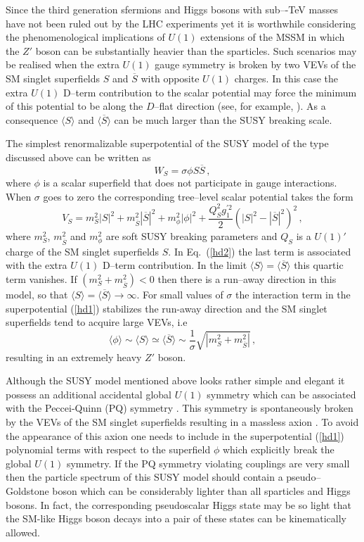 \documentclass[12pt,a4paper]{article}
\newcommand{\be}{\begin{equation}}
\newcommand{\ee}{\end{equation}}
\newcommand{\ds}{\displaystyle}
\begin{document}
 Since the third generation sfermions and Higgs bosons with sub–-TeV
 masses have not been ruled out by the LHC experiments yet it is worthwhile
 considering the phenomenological implications of $U(1)$
 extensions of the MSSM in which the $Z'$ boson can be substantially
 heavier than the sparticles. Such scenarios may be realised when the
 extra $U(1)$ gauge symmetry is broken by two VEVs of the SM singlet
 superfields $S$ and $\overline{S}$ with opposite $U(1)$ charges.  In
 this case the extra $U(1)$ D--term contribution to the scalar
 potential may force the minimum of this potential to be along the
 $D$--flat direction (see, for example, \cite{Kolda:1995iw}).  As a
 consequence $\langle S\rangle$ and $\langle\overline{S}\rangle$ can
 be much larger than the SUSY breaking scale.

The simplest renormalizable superpotential of the SUSY model of the type discussed above
can be written as
\be
W_S=\sigma \phi S \overline{S}\,,
\label{hd1}
\ee
where $\phi$ is a scalar superfield that does not participate in gauge interactions. When
$\sigma$ goes to zero the corresponding tree--level scalar potential takes the form
\begin{equation}
V_S = m^2_S |S|^2 + m^2_{\overline{S}} |\overline{S}|^2 + m^2_{\phi} |\phi|^2
+\ds\frac{Q_S^2 g^{'2}_1}{2}\left(|S|^2-|\overline{S}|^2\right)^2\,,
\label{hd2}
\end{equation}
where $m_S^2$, $m^2_{\overline{S}}$ and $m^2_{\phi}$ are soft SUSY breaking
parameters and $Q_S$ is a $U(1)'$ charge of the SM singlet superfields $S$. In Eq.~(\ref{hd2})
the last term is associated with the extra $U(1)$ D--term contribution. In the limit
$\langle S \rangle = \langle \overline{S} \rangle$ this quartic term vanishes. If
$(m^2_S + m^2_{\overline{S}})<0$ then there is a run--away direction in this
model, so that $\langle S \rangle = \langle \overline{S} \rangle \to \infty$.
For small values of $\sigma$ the interaction term in the superpotential (\ref{hd1}) stabilizes
the run-away direction and the SM singlet superfields tend to acquire large VEVs,
i.e
\be
\langle \phi \rangle \sim \langle S \rangle \simeq \langle \overline{S} \rangle
\sim \dfrac{1}{\sigma}\sqrt{|m^2_S + m^2_{\overline{S}}|}\,,
\label{hd3}
\ee
resulting in an extremely heavy $Z'$ boson.

Although the SUSY model mentioned above looks rather simple and elegant it
possess an additional accidental global $U(1)$ symmetry which can be
associated with the Peccei-Quinn (PQ) symmetry \cite{Peccei:1977hh}.
This symmetry is spontaneously broken by the VEVs of the SM singlet superfields
resulting in a massless axion \cite{axion}. To avoid the appearance of this axion
one needs to include in the superpotential (\ref{hd1}) polynomial terms with respect
to the superfield $\phi$ which explicitly break the global $U(1)$ symmetry. If the PQ
symmetry violating couplings are very small then the particle spectrum of this
SUSY model should contain a pseudo--Goldstone boson which can be considerably
lighter than all sparticles and Higgs bosons. In fact, the corresponding pseudoscalar
Higgs state may be so light that the SM-like Higgs boson decays into a pair of
these states can be kinematically allowed.
\end{document}
